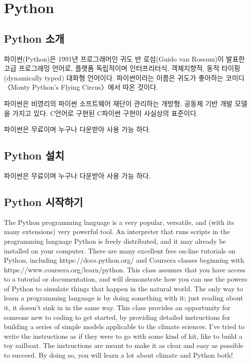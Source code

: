 \section{Python}

\subsection{Python 소개}

파이썬(Python)은 1991년 프로그래머인 귀도 반 로섬(Guido van Rossum)이 발표한 고급 프로그래밍 언어로, 플랫폼 독립적이며 인터프리터식, 객체지향적, 동적 타이핑(dynamically typed) 대화형 언어이다. 파이썬이라는 이름은 귀도가 좋아하는 코미디 〈Monty Python's Flying Circus〉에서 따온 것이다.

파이썬은 비영리의 파이썬 소프트웨어 재단이 관리하는 개방형, 공동체 기반 개발 모델을 가지고 있다. C언어로 구현된 C파이썬 구현이 사실상의 표준이다.

파이썬은 무료이며 누구나 다운받아 사용 가능 하다.


\subsection{Python 설치}

파이썬은 무료이며 누구나 다운받아 사용 가능 하다.


\subsection{Python 시작하기}\index{}

The Python programming language is a very popular, versatile, and (with its many extensions) very powerful tool. An interpreter that runs scripts in the programming language Python is freely distributed, and it may already be installed on your computer. There are many excellent free on-line tutorials on Python, including https://docs.python.org/ and Coursera classes beginning with https://www.coursera.org/learn/python. This class assumes that you have access to a tutorial or documentation, and will demonstrate how you can use the powers of Python to simulate things that happen in the natural world. The only way to learn a programming language is by doing something with it; just reading about it, it doesn't sink in in the same way. This class provides an opportunity for someone new to coding to get started, by providing detailed instructions for building a series of simple models applicable to the climate sciences. I've tried to write the instructions as if they were to go with some kind of kit, like to build a toy sailboat. The instructions are meant to make it as clear and easy as possible to succeed. By doing so, you will learn a lot about climate and Python both!

